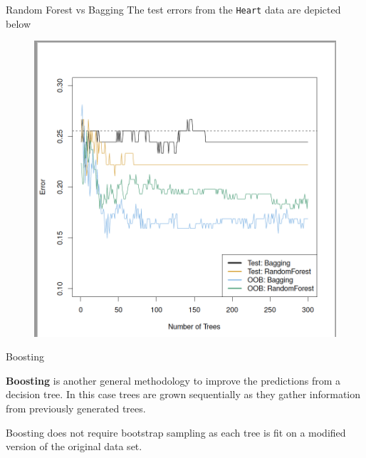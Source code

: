 \documentclass{beamer}
\begin{document}
\begin{frame}{Random Forest vs Bagging}
	The test errors from the {\tt Heart} data are depicted below
	 \begin{figure}[h]
		\centering
		\includegraphics[scale=0.35]{../../Figures/fig_bagging.png}
	\end{figure}
\end{frame}

\begin{frame}{Boosting}
	
	{\bf Boosting} is another general methodology to improve the predictions from a decision tree. 
	In this case trees are grown sequentially as they gather information from previously generated trees. 
	
 Boosting does not require bootstrap sampling as each tree is fit on a modified version of the original data set.
 
 
	
\end{frame}
\end{document}
